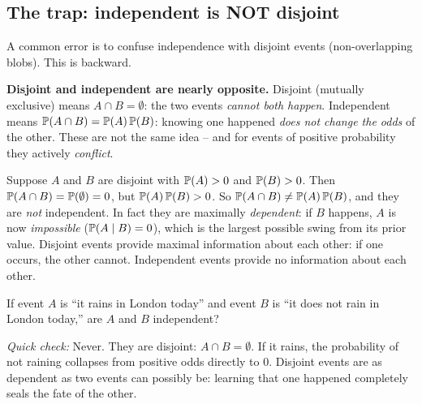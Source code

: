 \subsection{The trap: independent is NOT disjoint}

A common error is to confuse independence with disjoint events (non-overlapping blobs). This is backward.

\begin{trapbox}
\textbf{Disjoint and independent are nearly opposite.} Disjoint (mutually exclusive) means $A \cap B = \emptyset$: the two events \emph{cannot both happen}. Independent means $\P(A\cap B) = \P(A)\P(B)$: knowing one happened \emph{does not change the odds} of the other. These are not the same idea -- and for events of positive probability they actively \emph{conflict}.

Suppose $A$ and $B$ are disjoint with $\P(A) > 0$ and $\P(B) > 0$. Then $\P(A\cap B) = \P(\emptyset) = 0$, but $\P(A)\P(B) > 0$. So $\P(A \cap B) \ne \P(A)\P(B)$, and they are \emph{not} independent. In fact they are maximally \emph{dependent}: if $B$ happens, $A$ is now \emph{impossible} ($\P(A\given B) = 0$), which is the largest possible swing from its prior value. Disjoint events provide maximal information about each other: if one occurs, the other cannot. Independent events provide no information about each other.
\end{trapbox}

\begin{recoverybox}
If event $A$ is ``it rains in London today'' and event $B$ is ``it does not rain in London today,'' are $A$ and $B$ independent?
\vspace{0.4em}

\emph{Quick check:} Never. They are disjoint: $A \cap B = \emptyset$. If it rains, the probability of not raining collapses from positive odds directly to $0$. Disjoint events are as dependent as two events can possibly be: learning that one happened completely seals the fate of the other.
\end{recoverybox}

